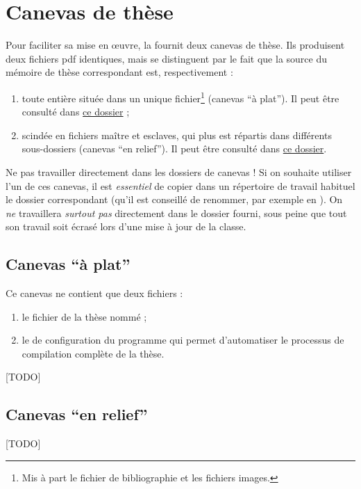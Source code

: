 \chapter{Canevas de thèse}\label{cha:canevas}

Pour faciliter sa mise en œuvre, la \yatcl fournit deux canevas de thèse. Ils
produisent deux fichiers \gls{pdf} identiques, mais se distinguent par le fait
que la source  du mémoire de thèse correspondant est,
respectivement :
\begin{enumerate}
\item toute entière située dans un unique fichier\footnote{Mis à part le
    fichier de bibliographie et les fichiers images.} (canevas \enquote{à
    plat}). Il peut être consulté dans \href{single-file-template/.}{ce dossier} ;
\item scindée en fichiers maître et esclaves, qui plus est répartis dans
  différents sous-dossiers (canevas \enquote{en relief}). Il peut être
  consulté dans \href{master-slaves-files-template/.}{ce dossier}.
\end{enumerate}

\begin{dbwarning}{Ne pas travailler directement dans les dossiers de canevas !}{}
  Si on souhaite utiliser l'un de ces canevas, il est \emph{essentiel} de
  copier dans un répertoire de travail habituel le dossier correspondant (qu'il
  est conseillé de renommer, par exemple en ). On \emph{ne}
  travaillera \emph{surtout pas} directement dans le dossier fourni, sous peine
  que tout son travail soit écrasé lors d'une mise à jour de la classe.
\end{dbwarning}

\section{Canevas \enquote{à plat}}
\label{sec:canevas-a-plat}

Ce canevas ne contient que deux fichiers :
\begin{enumerate}
\item le fichier de la thèse nommé  ;
\item le  de configuration du programme  qui
  permet d'automatiser le processus de compilation complète de la thèse.
\end{enumerate}

[TODO]

\section{Canevas \enquote{en relief}}
\label{sec:canevas-relief}

[TODO]

%
\iffalse
\fi
